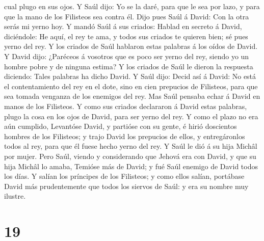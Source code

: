 cual plugo en sus ojos.  Y Saúl dijo: Yo se la daré, para
que le sea por lazo, y para que la mano de los Filisteos sea contra él.
Dijo pues Saúl á David: Con la otra serás mi yerno hoy. 
Y mandó Saúl á sus criados: Hablad en secreto á David, diciéndole: He
aquí, el rey te ama, y todos sus criados te quieren bien; sé pues yerno
del rey.  Y los criados de Saúl hablaron estas palabras á
los oídos de David. Y David dijo: ¿Paréceos á vosotros que es poco ser
yerno del rey, siendo yo un hombre pobre y de ninguna estima?
 Y los criados de Saúl le dieron la respuesta diciendo:
Tales palabras ha dicho David.  Y Saúl dijo: Decid así á
David: No está el contentamiento del rey en el dote, sino en cien
prepucios de Filisteos, para que sea tomada venganza de los enemigos del
rey. Mas Saúl pensaba echar á David en manos de los Filisteos.
 Y como sus criados declararon á David estas palabras,
plugo la cosa en los ojos de David, para ser yerno del rey. Y como el
plazo no era aún cumplido,  Levantóse David, y partióse
con su gente, é hirió doscientos hombres de los Filisteos; y trajo David
los prepucios de ellos, y entregáronlos todos al rey, para que él fuese
hecho yerno del rey. Y Saúl le dió á su hija Michâl por mujer.
 Pero Saúl, viendo y considerando que Jehová era con
David, y que su hija Michâl lo amaba,  Temióse más de
David; y fué Saúl enemigo de David todos los días.  Y
salían los príncipes de los Filisteos; y como ellos salían, portábase
David más prudentemente que todos los siervos de Saúl: y era su nombre
muy ilustre.

\hypertarget{section-18}{%
\section{19}\label{section-18}}


